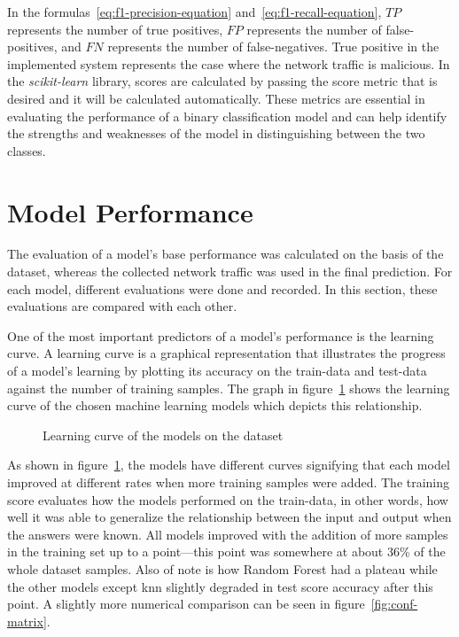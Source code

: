 In the formulas~\ref{eq:f1-precision-equation} and~\ref{eq:f1-recall-equation}, $TP$ represents the number of true positives,
$FP$ represents the number of \gls{false-positive}s, and $FN$ represents the number of \gls{false-negative}s.
True positive in the implemented system represents the case where the network traffic is malicious.
In the \emph{scikit-learn} library, scores are calculated by passing the score metric that is desired and it will be calculated automatically.
These metrics are essential in evaluating the performance of a binary classification model and can help identify the strengths and weaknesses of the model in distinguishing between the two classes.


\section{Model Performance}\label{sec:model-performance}

The evaluation of a model's base performance was calculated on the basis of the dataset, whereas the collected network traffic was used in the final prediction.
For each model, different evaluations were done and recorded.
In this section, these evaluations are compared with each other.

One of the most important predictors of a model's performance is the learning curve.
A learning curve is a graphical representation that illustrates the progress of a model's learning by plotting its accuracy on the \gls{train-data} and
\gls{test-data} against the number of training samples.
The graph in figure~\ref{fig:learning-curve} shows the learning curve of the chosen machine learning models which depicts this relationship.

\begin{figure}[H]
    \centering
    \caption{Learning curve of the models on the dataset}
    \label{fig:learning-curve}
\end{figure}

As shown in figure~\ref{fig:learning-curve}, the models have different curves signifying that each model improved at different rates when more training samples were added.
The training score evaluates how the models performed on the \gls{train-data}, in other words, how well it was able to generalize the relationship between the input and output when the answers were known.
All models improved with the addition of more samples in the training set up to a point---this point was somewhere at about 36\% of the whole dataset samples.
Also of note is how Random Forest had a plateau while the other models except \gls{knn} slightly degraded in test score accuracy after this point.
A slightly more numerical comparison can be seen in figure~\ref{fig:conf-matrix}.


